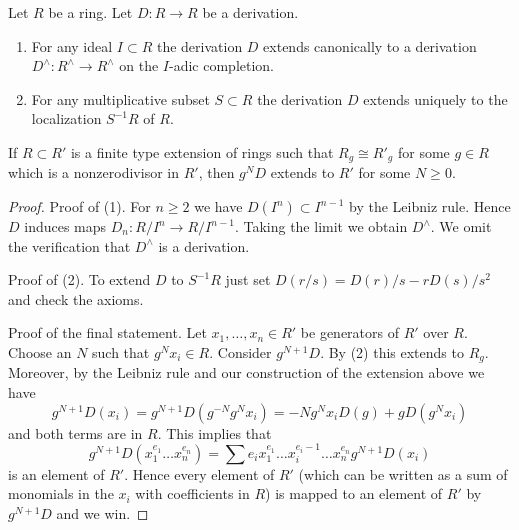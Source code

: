 \begin{lemma}
\label{lemma-derivation-extends}
Let $R$ be a ring. Let $D : R \to R$ be a derivation.
\begin{enumerate}
\item For any ideal $I \subset R$ the derivation $D$ extends
canonically to a derivation $D^\wedge : R^\wedge \to R^\wedge$
on the $I$-adic completion.
\item For any multiplicative subset $S \subset R$ the derivation
$D$ extends uniquely to the localization $S^{-1}R$ of $R$.
\end{enumerate}
If $R \subset R'$ is a finite type extension of rings such that
$R_g \cong R'_g$ for some $g \in R$ which is a nonzerodivisor in $R'$,
then $g^ND$ extends to $R'$ for some $N \geq 0$.
\end{lemma}

\begin{proof}
Proof of (1). For $n \geq 2$ we have $D(I^n) \subset I^{n - 1}$
by the Leibniz rule. Hence $D$ induces maps $D_n : R/I^n \to R/I^{n - 1}$.
Taking the limit we obtain $D^\wedge$. We omit the verification that
$D^\wedge$ is a derivation.

\medskip\noindent
Proof of (2). To extend $D$ to $S^{-1}R$ just set
$D(r/s) = D(r)/s - rD(s)/s^2$ and check the axioms.

\medskip\noindent
Proof of the final statement. Let $x_1, \ldots, x_n \in R'$ be generators
of $R'$ over $R$. Choose an $N$ such that $g^Nx_i \in R$.
Consider $g^{N + 1}D$. By (2) this extends to $R_g$. Moreover, by
the Leibniz rule and our construction of the extension above we have
$$
g^{N + 1}D(x_i) = g^{N + 1}D(g^{-N} g^Nx_i) = -Ng^Nx_iD(g) +
gD(g^Nx_i)
$$
and both terms are in $R$. This implies that
$$
g^{N + 1}D(x_1^{e_1} \ldots x_n^{e_n}) =
\sum e_i x_1^{e_1} \ldots x_i^{e_i - 1} \ldots x_n^{e_n} g^{N + 1}D(x_i)
$$
is an element of $R'$. Hence every element of $R'$ (which can be written
as a sum of monomials in the $x_i$ with coefficients in $R$) is mapped to an
element of $R'$ by $g^{N + 1}D$ and we win.
\end{proof}
